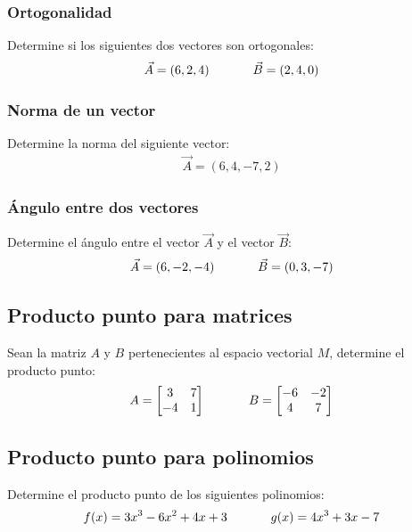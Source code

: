 \documentclass{article}
\begin{document}
        \subsubsection{Ortogonalidad}

            Determine si los siguientes dos vectores son ortogonales:
            \begin{gather*}
                \vec{A} = (6,2,4) \hspace*{35 pt} \vec{B}=(2,4,0)
            \end{gather*}

        \subsubsection{Norma de un vector}

            Determine la norma del siguiente vector:
            \begin{gather*}
                \vec{A} = (6,4,-7,2)
            \end{gather*}

        \subsubsection{Ángulo entre dos vectores}

            Determine el ángulo entre el vector $\vec{A}$ y el vector $\vec{B}$:
            \begin{gather*}
                \vec{A} = (6,-2,-4) \hspace*{35 pt} \vec{B} = (0, 3, -7)
            \end{gather*}

    \subsection{Producto punto para matrices}

            Sean la matriz $A$ y $B$ pertenecientes al espacio vectorial $M$, determine el producto punto:
            \begin{gather*}
                A = \begin{bmatrix}
                    3  & 7 \\
                    -4 & 1
                \end{bmatrix} \hspace*{35 pt}
                B = \begin{bmatrix}
                    -6 & -2 \\
                    4  & 7
                \end{bmatrix}
            \end{gather*}
    
    \subsection{Producto punto para polinomios}

        Determine el producto punto de los siguientes polinomios:
        \begin{gather*}
            f(x) = 3x^3 - 6x^2 + 4x + 3 \hspace*{35 pt}
            g(x) = 4x^3 + 3x - 7
        \end{gather*}
\end{document}
